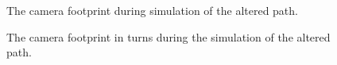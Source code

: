 \begin{figure}[!ht]
    \centering
    \caption{The camera footprint during simulation of the altered path.}
	\label{fig:both_camera_path}
\end{figure}

\begin{figure}[!ht]
    \centering
    \caption{The camera footprint in turns during the simulation of the altered path.}
	\label{fig:both_camera_turns}
\end{figure}